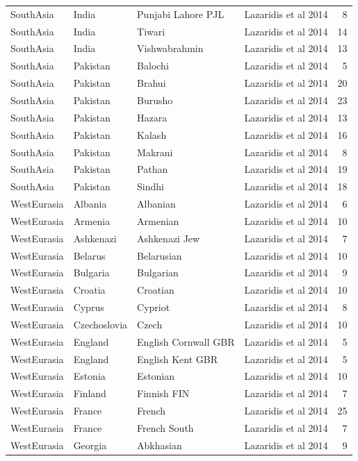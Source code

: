 \begin{longtable}[t]{lll>{\raggedright\arraybackslash}p{9em}r}
SouthAsia & India & Punjabi Lahore PJL & Lazaridis et al 2014 & 8\\
SouthAsia & India & Tiwari & Lazaridis et al 2014 & 14\\
SouthAsia & India & Vishwabrahmin & Lazaridis et al 2014 & 13\\
SouthAsia & Pakistan & Balochi & Lazaridis et al 2014 & 5\\
SouthAsia & Pakistan & Brahui & Lazaridis et al 2014 & 20\\
SouthAsia & Pakistan & Burusho & Lazaridis et al 2014 & 23\\
SouthAsia & Pakistan & Hazara & Lazaridis et al 2014 & 13\\
SouthAsia & Pakistan & Kalash & Lazaridis et al 2014 & 16\\
SouthAsia & Pakistan & Makrani & Lazaridis et al 2014 & 8\\
SouthAsia & Pakistan & Pathan & Lazaridis et al 2014 & 19\\
SouthAsia & Pakistan & Sindhi & Lazaridis et al 2014 & 18\\
WestEurasia & Albania & Albanian & Lazaridis et al 2014 & 6\\
WestEurasia & Armenia & Armenian & Lazaridis et al 2014 & 10\\
WestEurasia & Ashkenazi & Ashkenazi Jew & Lazaridis et al 2014 & 7\\
WestEurasia & Belarus & Belarusian & Lazaridis et al 2014 & 10\\
WestEurasia & Bulgaria & Bulgarian & Lazaridis et al 2014 & 9\\
WestEurasia & Croatia & Croatian & Lazaridis et al 2014 & 10\\
WestEurasia & Cyprus & Cypriot & Lazaridis et al 2014 & 8\\
WestEurasia & Czechoslovia & Czech & Lazaridis et al 2014 & 10\\
WestEurasia & England & English Cornwall GBR & Lazaridis et al 2014 & 5\\
WestEurasia & England & English Kent GBR & Lazaridis et al 2014 & 5\\
WestEurasia & Estonia & Estonian & Lazaridis et al 2014 & 10\\
WestEurasia & Finland & Finnish FIN & Lazaridis et al 2014 & 7\\
WestEurasia & France & French & Lazaridis et al 2014 & 25\\
WestEurasia & France & French South & Lazaridis et al 2014 & 7\\
WestEurasia & Georgia & Abkhasian & Lazaridis et al 2014 & 9\\

\end{longtable}
